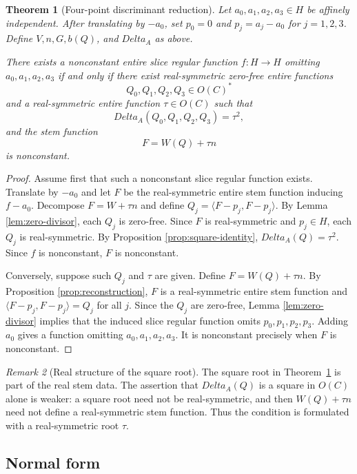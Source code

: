 \documentclass[11pt]{amsart}
\def\HH{H}%
\def\CC{C}%
\def\OO{O}%
\def\DeltaA{Delta_A}%
\numberwithin{equation}{section}
\newtheorem{theorem}{Theorem}[section]
\theoremstyle{definition}
\theoremstyle{remark}
\newtheorem{remark}[theorem]{Remark}
\newcommand{\HH}{\mathbb H}
\newcommand{\CC}{\mathbb C}
\newcommand{\OO}{\mathcal O}
\newcommand{\DeltaA}{\Delta_A}
\begin{document}
\begin{theorem}[Four-point discriminant reduction]\label{thm:discriminant-reduction}
Let $a_0,a_1,a_2,a_3\in\HH$ be affinely independent. After translating by $-a_0$, set $p_0=0$ and $p_j=a_j-a_0$ for $j=1,2,3$. Define $V,n,G,b(Q)$, and $\DeltaA$ as above.

There exists a nonconstant entire slice regular function $f:\HH\to\HH$ omitting $a_0,a_1,a_2,a_3$ if and only if there exist real-symmetric zero-free entire functions
\[
Q_0,Q_1,Q_2,Q_3\in\OO(\CC)^*
\]
and a real-symmetric entire function $\tau\in\OO(\CC)$ such that
\[
\DeltaA(Q_0,Q_1,Q_2,Q_3)=\tau^2,
\]
and the stem function
\[
F=W(Q)+\tau n
\]
is nonconstant.
\end{theorem}

\begin{proof}
Assume first that such a nonconstant slice regular function exists. Translate by $-a_0$ and let $F$ be the real-symmetric entire stem function inducing $f-a_0$. Decompose $F=W+\tau n$ and define $Q_j=\langle F-p_j,F-p_j\rangle$. By Lemma \ref{lem:zero-divisor}, each $Q_j$ is zero-free. Since $F$ is real-symmetric and $p_j\in\HH$, each $Q_j$ is real-symmetric. By Proposition \ref{prop:square-identity}, $\DeltaA(Q)=\tau^2$. Since $f$ is nonconstant, $F$ is nonconstant.

Conversely, suppose such $Q_j$ and $\tau$ are given. Define $F=W(Q)+\tau n$. By Proposition \ref{prop:reconstruction}, $F$ is a real-symmetric entire stem function and $\langle F-p_j,F-p_j\rangle=Q_j$ for all $j$. Since the $Q_j$ are zero-free, Lemma \ref{lem:zero-divisor} implies that the induced slice regular function omits $p_0,p_1,p_2,p_3$. Adding $a_0$ gives a function omitting $a_0,a_1,a_2,a_3$. It is nonconstant precisely when $F$ is nonconstant.
\end{proof}

\begin{remark}[Real structure of the square root]
The square root in Theorem~\ref{thm:discriminant-reduction} is part of the real stem data.  The assertion that $\DeltaA(Q)$ is a square in $\OO(\CC)$ alone is weaker: a square root need not be real-symmetric, and then $W(Q)+\tau n$ need not define a real-symmetric stem function.  Thus the condition is formulated with a real-symmetric root $\tau$.
\end{remark}

\subsection{Normal form}
\end{document}
